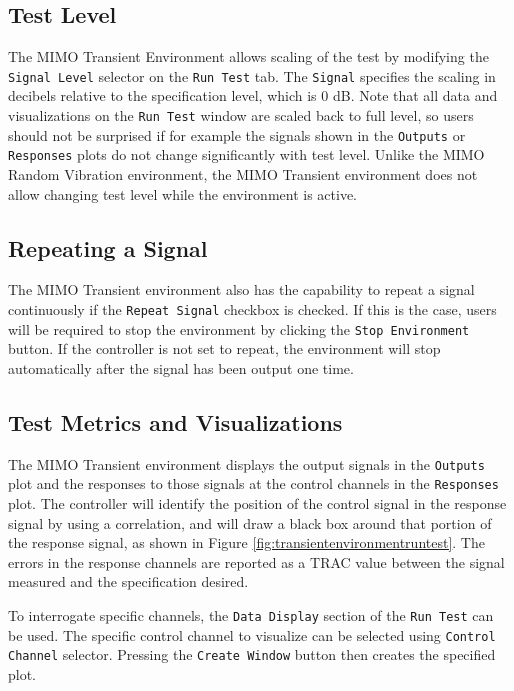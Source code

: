 \documentclass[pdf,12pt,report]{SANDreport}
\newcommand{\inlineCode}{\lstinline[basicstyle=\bfseries\ttfamily]}
\begin{document}
    \subsection{Test Level}
    The \Ac{MIMO} Transient Environment allows scaling of the test by modifying the \inlineCode{Signal Level} selector on the \inlineCode{Run Test} tab.  The \inlineCode{Signal} specifies the scaling in decibels relative to the specification level, which is 0 dB.  Note that all data and visualizations on the \inlineCode{Run Test} window are scaled back to full level, so users should not be surprised if for example the signals shown in the \inlineCode{Outputs} or \inlineCode{Responses} plots do not change significantly with test level.  Unlike the \ac{MIMO} Random Vibration environment, the \Ac{MIMO} Transient environment does not allow changing test level while the environment is active.
    
    \subsection{Repeating a Signal}
    The \Ac{MIMO} Transient environment also has the capability to repeat a signal continuously if the \inlineCode{Repeat Signal} checkbox is checked.  If this is the case, users will be required to stop the environment by clicking the \inlineCode{Stop Environment} button.  If the controller is not set to repeat, the environment will stop automatically after the signal has been output one time.
    
    \subsection{Test Metrics and Visualizations}
    The \Ac{MIMO} Transient environment displays the output signals in the \inlineCode{Outputs} plot and the responses to those signals at the control channels in the \inlineCode{Responses} plot.  The controller will identify the position of the control signal in the response signal by using a correlation, and will draw a black box around that portion of the response signal, as shown in Figure \ref{fig:transientenvironmentruntest}.  The errors in the response channels are reported as a \Ac{TRAC} value between the signal measured and the specification desired.

    To interrogate specific channels, the \inlineCode{Data Display} section of the \inlineCode{Run Test} can be used.  The specific control channel to visualize can be selected using \inlineCode{Control Channel} selector.  Pressing the \inlineCode{Create Window} button then creates the specified plot.
    
\end{document}
